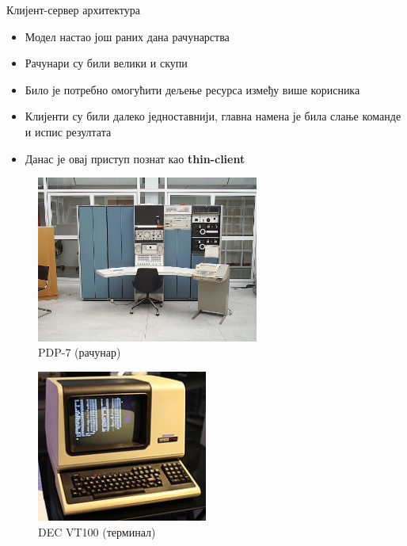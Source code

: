 \documentclass{beamer}
\begin{document}
    \begin{frame}[allowframebreaks]{Клијент-сервер архитектура}
        \begin{itemize}
            \item Модел настао још раних дана рачунарства
            \item Рачунари су били велики и скупи
            \item Било је потребно омогућити дељење ресурса између више корисника
            \item Клијенти су били далеко једноставнији, главна намена је била слање команде и испис резултата
            \item Данас је овај приступ познат као \textbf{thin-client}
        \end{itemize}
        
        \framebreak
        
        \begin{figure}
            \centering
            \includegraphics[width=0.65\textwidth]{images/pdp7.jpeg}
            \caption{PDP-7 (рачунар)}
            \label{fig:mainframe}
        \end{figure}
        
        \framebreak
        
        \begin{figure}
            \centering
            \includegraphics[width=0.5\textwidth]{images/DEC_VT100_terminal.jpg}
            \caption{DEC VT100 (терминал)}
            \label{fig:terminal}
        \end{figure}
        

\end{frame}
\end{document}
